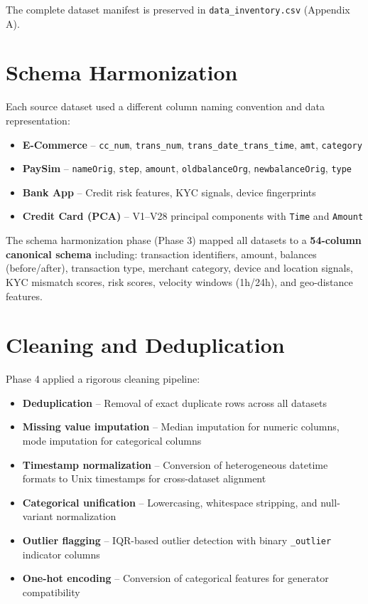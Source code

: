 \documentclass[12pt,a4paper,oneside]{book}
\begin{document}
The complete dataset manifest is preserved in \texttt{data\_inventory.csv} (Appendix A).

\section{Schema Harmonization}

Each source dataset used a different column naming convention and data representation:

\begin{itemize}
    \item \textbf{E-Commerce} -- \texttt{cc\_num}, \texttt{trans\_num}, \texttt{trans\_date\_trans\_time}, \texttt{amt}, \texttt{category}
    \item \textbf{PaySim} -- \texttt{nameOrig}, \texttt{step}, \texttt{amount}, \texttt{oldbalanceOrg}, \texttt{newbalanceOrig}, \texttt{type}
    \item \textbf{Bank App} -- Credit risk features, KYC signals, device fingerprints
    \item \textbf{Credit Card (PCA)} -- V1--V28 principal components with \texttt{Time} and \texttt{Amount}
\end{itemize}

The schema harmonization phase (Phase 3) mapped all datasets to a \textbf{54-column canonical schema} including: transaction identifiers, amount, balances (before/after), transaction type, merchant category, device and location signals, KYC mismatch scores, risk scores, velocity windows (1h/24h), and geo-distance features.

\section{Cleaning and Deduplication}

Phase 4 applied a rigorous cleaning pipeline:

\begin{itemize}
    \item \textbf{Deduplication} -- Removal of exact duplicate rows across all datasets
    \item \textbf{Missing value imputation} -- Median imputation for numeric columns, mode imputation for categorical columns
    \item \textbf{Timestamp normalization} -- Conversion of heterogeneous datetime formats to Unix timestamps for cross-dataset alignment
    \item \textbf{Categorical unification} -- Lowercasing, whitespace stripping, and null-variant normalization
    \item \textbf{Outlier flagging} -- IQR-based outlier detection with binary \texttt{\_outlier} indicator columns
    \item \textbf{One-hot encoding} -- Conversion of categorical features for generator compatibility
\end{itemize}
\end{document}
